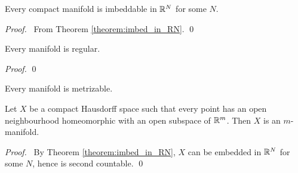 \begin{theorem}
    Every compact manifold is imbeddable in $\mathbb{R}^N$ for some $N$.
\end{theorem}

\begin{proof}
    \pf\ From Theorem \ref{theorem:imbed_in_RN}. \qed
\end{proof}

\begin{proposition}
    Every manifold is regular.
\end{proposition}

\begin{proof}
    \pf
    \qed
\end{proof}

\begin{corollary}
    Every manifold is metrizable.
\end{corollary}

\begin{proposition}
    Let $X$ be a compact Hausdorff space such that every point has an open neighbourhood homeomorphic with an open subspace of $\mathbb{R}^m$.
    Then $X$ is an $m$-manifold.
\end{proposition}

\begin{proof}
    \pf\ By Theorem \ref{theorem:imbed_in_RN}, $X$ can be embedded in $\mathbb{R}^N$ for some $N$, hence is second countable. \qed
\end{proof}
